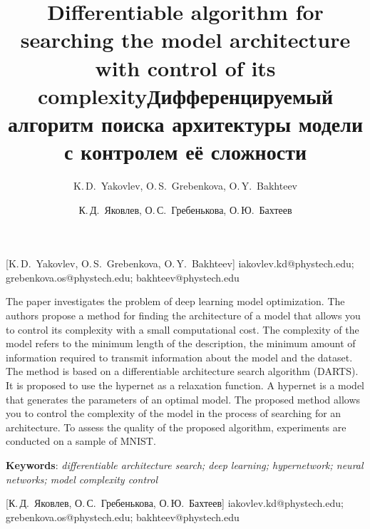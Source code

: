 \documentclass[12pt, twoside]{article}
\begin{document}
\title
    [Differentiable algorithm for searching the model architecture with control of its complexity] %
    {Differentiable algorithm for searching the model architecture with control of its complexity}
\author
    [K.\,D.~Yakovlev, O.\,S.~Grebenkova, O.\,Y.~Bakhteev] %
    {K.\,D.~Yakovlev, O.\,S.~Grebenkova, O.\,Y.~Bakhteev} %
    [K.\,D.~Yakovlev, O.\,S.~Grebenkova, O.\,Y.~Bakhteev] %
\email
    { iakovlev.kd@phystech.edu; grebenkova.os@phystech.edu; bakhteev@phystech.edu}

\abstract
{The paper investigates the problem of deep learning model optimization. The authors propose a method for finding the architecture of a model that allows you to control its complexity with a small computational cost. The complexity of the model refers to the minimum length of the description,
the minimum amount of information required to transmit information about the model and the dataset. The method is based on a differentiable architecture search algorithm (DARTS). It is proposed to use the hypernet as a relaxation function. A hypernet is a model that generates the parameters of an optimal model. The proposed method allows you to control the complexity of the model in the process of searching for an architecture. To assess the quality of the proposed algorithm, experiments are conducted on a sample of MNIST.
	
\bigskip
\noindent
\textbf{Keywords}: \emph {differentiable architecture search; deep learning; hypernetwork; neural networks; model complexity control}
}





\maketitle
\linenumbers

\title
    [Дифференцируемый алгоритм поиска архитектуры модели с контролем её сложности] %
    {Дифференцируемый алгоритм поиска архитектуры модели с контролем её сложности}
\author
    [К.\,Д.~Яковлев, О.\,С.~Гребенькова, О.\,Ю.~Бахтеев] %
    {К.\,Д.~Яковлев, О.\,С.~Гребенькова, О.\,Ю.~Бахтеев} %
    [К.\,Д.~Яковлев, О.\,С.~Гребенькова, О.\,Ю.~Бахтеев] %
\email
    { iakovlev.kd@phystech.edu; grebenkova.os@phystech.edu; bakhteev@phystech.edu}
\end{document}
